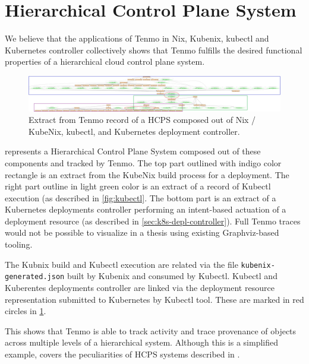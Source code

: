 \section{Hierarchical Control Plane System}

We believe that the applications of Tenmo in Nix, Kubenix, kubectl and Kubernetes controller collectively shows that Tenmo fulfills the desired functional properties of a hierarchical cloud control plane system.
\begin{figure}[p]
    \centering
    \vspace{-4em}
    \begin{sideways}
    \includegraphics[scale=0.1]{img/huge-graph-3.png}
    \end{sideways}
    \vspace{-1em} 
    \caption{Extract from Tenmo record of a HCPS composed out of Nix / KubeNix, kubectl, and Kubernetes deployment controller.} 
    \label{fig:huge-graph-dot}
\end{figure}

 represents a Hierarchical Control Plane System composed out of these components and tracked by Tenmo. The top part outlined with indigo color rectangle is an extract from the KubeNix build process for a deployment. The right part outline in light green color is an extract of a record of Kubectl execution (as described in \cref{fig:kubectl}. The bottom part is an extract of a Kubernetes deployments controller performing an intent-based actuation of a deployment resource (as described in \cref{sec:k8s-depl-controller}). Full Tenmo traces would not be possible to visualize in a thesis using existing Graphviz-based tooling.

The Kubnix build and Kubectl execution are related via the file \texttt{kubenix-generated.json} built by Kubenix and consumed by Kubectl. Kubectl and Kuberentes deployments controller are linked via the deployment resource representation submitted to Kubernetes by Kubectl tool. These are marked in red circles in \cref{fig:huge-graph-dot}.

This shows that Tenmo is able to track activity and trace provenance of objects across multiple levels of a hierarchical system. Although this is a simplified example, covers the peculiarities of HCPS systems described in .






